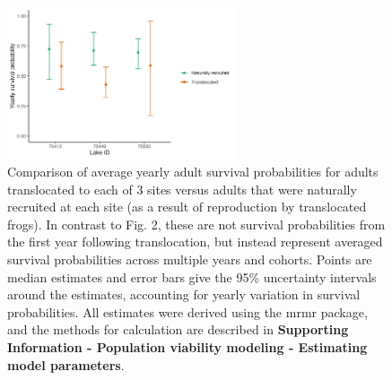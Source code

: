 \documentclass[9pt,twoside,lineno]{pnas-new-SI}
\begin{document}
\begin{figure}

{\centering \includegraphics[width=0.60\textwidth]{figures/compare_surv_probs.jpg}

}

\caption{\label{fig-compare_surv_probs}Comparison of average yearly
adult survival probabilities for adults translocated to each of 3 sites
versus adults that were naturally recruited at each site (as a result of
reproduction by translocated frogs). In contrast to
Fig. 2, these are not survival
probabilities from the first year following translocation, but instead
represent averaged survival probabilities across multiple years and
cohorts. Points are median estimates and error bars give the 95\%
uncertainty intervals around the estimates, accounting for yearly
variation in survival probabilities. All estimates were derived using
the mrmr package, and the methods for calculation are described in
\textbf{Supporting Information - Population viability modeling -
Estimating model parameters}.}

\end{figure}\clearpage

\newpage
\end{document}
